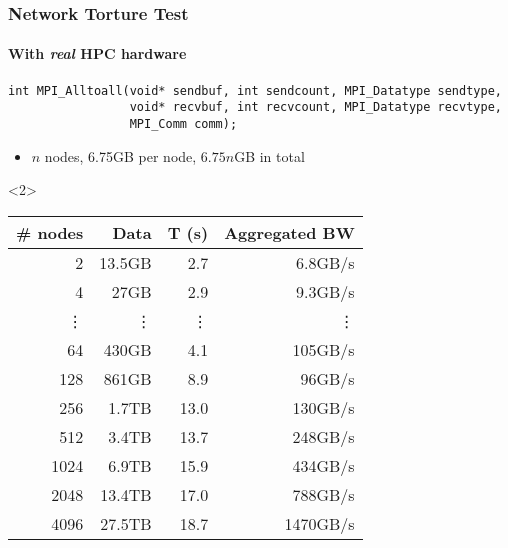 \documentclass[xcolor={x11names,svgnames,psnames}]{beamer}
\newenvironment{wider}{%
\begin{adjustwidth}{-0.6cm}{}%
  \begin{minipage}{12cm}%
}{%
\end{minipage}%
\end{adjustwidth}%
}
\begin{document}
\begin{frame}[fragile]
  \frametitle{Network Torture Test}
  \framesubtitle{With \emph{real} HPC hardware}

  \begin{wider}
\begin{verbatim}
int MPI_Alltoall(void* sendbuf, int sendcount, MPI_Datatype sendtype,
                 void* recvbuf, int recvcount, MPI_Datatype recvtype,
                 MPI_Comm comm);
\end{verbatim}
  \end{wider}

    \begin{itemize}  
    \item $n$ nodes, 6.75GB per node, $6.75n$GB in total
    \end{itemize}
 
\medskip

\footnotesize
\begin{overlayarea}{\textwidth}{5cm}
  \centering
  
  \begin{onlyenv}<2>
    \begin{tabular}{|r|r|r|r|}
  \hline
  \# nodes & Data             & T (s)        & Aggregated BW \\
  \hline\hline
  2        & 13.5GB           & 2.7      & 6.8GB/s \\
  4        & 27GB             & 2.9      & 9.3GB/s \\
    \vdots & \vdots           & \vdots   & \vdots  \\                                         
  64       & 430GB            & 4.1      & 105GB/s \\
  128      & 861GB            & 8.9      &  96GB/s \\
  256      & 1.7TB            & 13.0     & 130GB/s \\
  512      & 3.4TB            & 13.7     & 248GB/s \\
  1024     & 6.9TB            & 15.9     & 434GB/s \\
  2048     & 13.4TB           & 17.0     & 788GB/s \\
  4096     & 27.5TB           & 18.7     & 1470GB/s \\
    \hline
    \end{tabular}
  \end{onlyenv}
\end{overlayarea}

\end{frame}
\end{document}
